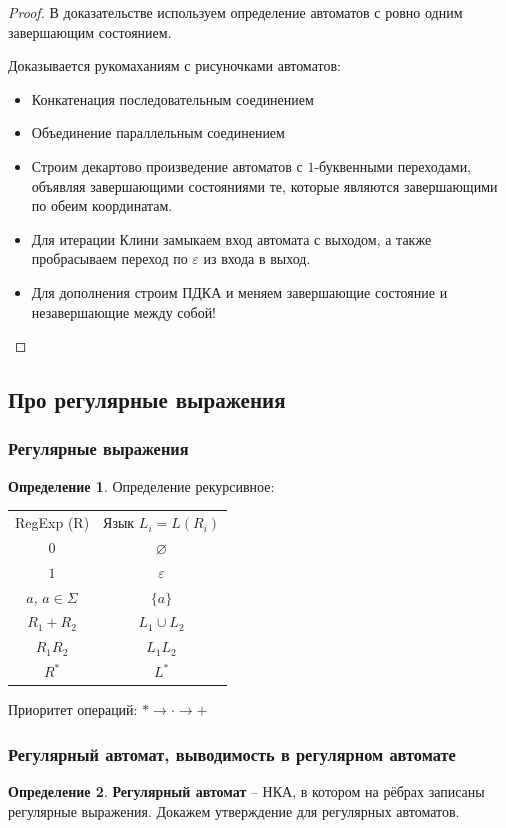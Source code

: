 \documentclass[a4paper,12pt]{article}
\renewcommand{\emptyset}{\ensuremath{\varnothing}}
\theoremstyle{plain}
\theoremstyle{definition}
\newtheorem{definition}{Определение}[subsection]
\theoremstyle{remark}
\begin{document}
\begin{proof}
	В доказательстве используем определение автоматов с ровно одним завершающим состоянием.

	Доказывается рукомаханиям с рисуночками автоматов:
	\begin{itemize}
		\item Конкатенация последовательным соединением
		\item Объединение параллельным соединением
		\item Строим декартово произведение автоматов с $1$-буквенными переходами, объявляя завершающими состояниями те, которые являются завершающими по обеим координатам.
		\item Для итерации Клини замыкаем вход автомата с выходом, а также пробрасываем переход по $\varepsilon$ из входа в выход.
		\item Для дополнения строим ПДКА и меняем завершающие состояние и незавершающие между собой!
	\end{itemize}
\end{proof}

\subsection{Про регулярные выражения}
\subsubsection*{Регулярные выражения}
\begin{definition}
	Определение рекурсивное:

	\begin{tabular}{c | c}
		RegExp (R)          & Язык $L_i = L(R_i)$ \\
		$0$                 & $\emptyset$         \\
		$1$                 & ${\varepsilon}$     \\
		$a,\, a \in \Sigma$ & $\{a\}$             \\
		$R_1 + R_2$         & $L_1 \cup L_2$      \\
		$R_1R_2$            & $L_1L_2$            \\
		$R^*$               & $L^*$
	\end{tabular}

	Приоритет операций: $* \to \cdot \to +$
\end{definition}

\subsubsection*{Регулярный автомат, выводимость в регулярном автомате}
\begin{definition}
	\textbf{Регулярный автомат} -- НКА, в котором на рёбрах записаны регулярные выражения. Докажем утверждение для регулярных автоматов.
\end{definition}
\end{document}
